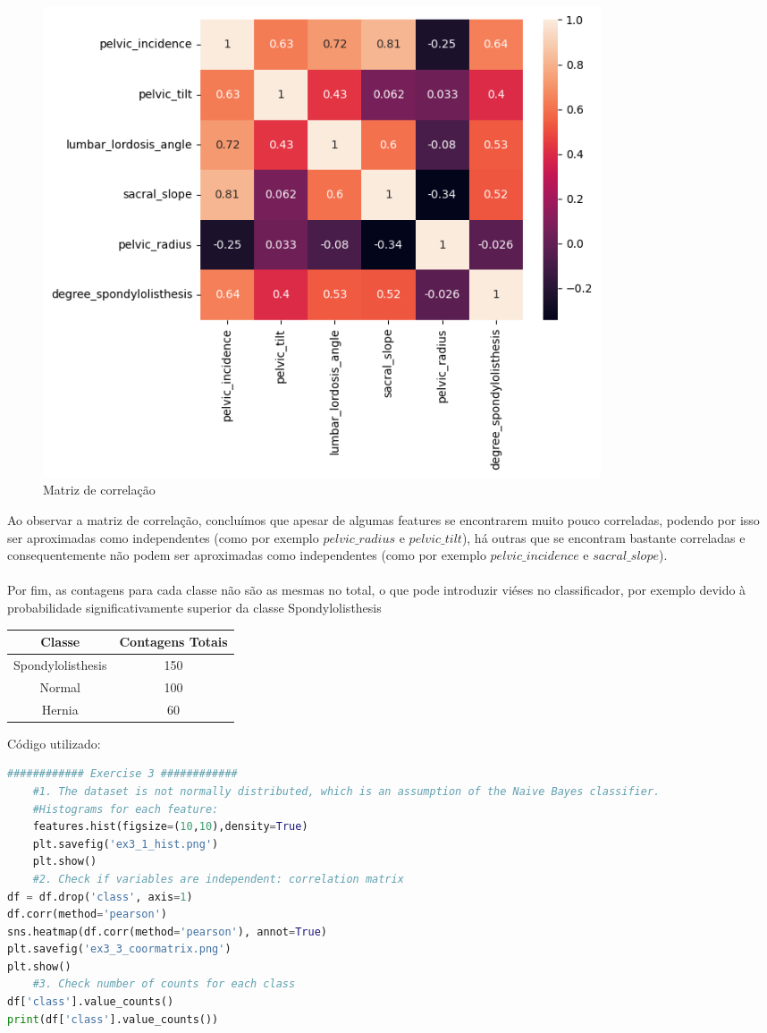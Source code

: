 \documentclass[a4paper,12pt]{article} %
\begin{document}
\begin{enumerate}
\begin{figure}[H]
    \centering
    \includegraphics[width=0.8\textwidth]{ex3_3_coormatrix.png}
    \caption{Matriz de correlação}
    \label{fig:ex3_corr}
\end{figure}

Ao observar a matriz de correlação, concluímos que apesar de algumas features se encontrarem muito pouco
correladas, podendo por isso ser aproximadas como independentes (como por exemplo $pelvic\_radius$ e $pelvic\_tilt$), há outras
que se encontram bastante correladas e consequentemente não podem ser aproximadas como independentes (como por exemplo $pelvic\_incidence$ e $sacral\_slope$).
\\ \\
Por fim, as contagens para cada classe não são as mesmas no total, o que pode introduzir viéses no classificador, por exemplo devido à probabilidade significativamente superior da classe Spondylolisthesis

\begin{table}[H]
    \centering
    \begin{tabular}{|c|c|}
        \hline 
        Classe & Contagens Totais \\ \hline
        Spondylolisthesis & 150 \\ \hline
        Normal & 100 \\ \hline
        Hernia & 60 \\ \hline
    \end{tabular}
\end{table}

Código utilizado:
\begin{lstlisting}[language=Python]
    ############ Exercise 3 ############
    #1. The dataset is not normally distributed, which is an assumption of the Naive Bayes classifier.
    #Histograms for each feature:
    features.hist(figsize=(10,10),density=True)
    plt.savefig('ex3_1_hist.png')
    plt.show()
    #2. Check if variables are independent: correlation matrix
df = df.drop('class', axis=1)
df.corr(method='pearson')
sns.heatmap(df.corr(method='pearson'), annot=True)
plt.savefig('ex3_3_coormatrix.png')
plt.show()
    #3. Check number of counts for each class
df['class'].value_counts()
print(df['class'].value_counts())
\end{lstlisting}

\end{enumerate}
\end{document}
